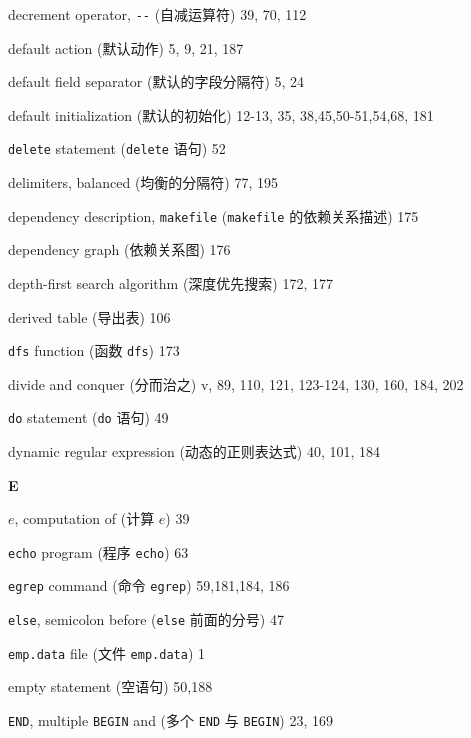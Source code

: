 \begin{multicols}{2}
\hangindent=2pc  decrement operator, \verb'--' (自减运算符) 39, 70, 112

\hangindent=2pc  default action (默认动作) 5, 9, 21, 187

\hangindent=2pc  default field separator (默认的字段分隔符) 5, 24

\hangindent=2pc  default initialization (默认的初始化) 12-13, 35, 38,45,50-51,54,68, 181

\hangindent=2pc  \verb'delete' statement (\verb'delete' 语句) 52

\hangindent=2pc  delimiters, balanced (均衡的分隔符) 77, 195

\hangindent=2pc  dependency description, \verb'makefile'
(\verb'makefile' 的依赖关系描述) 175

\hangindent=2pc  dependency graph (依赖关系图) 176

\hangindent=2pc  depth-first search algorithm (深度优先搜索) 172, 177

\hangindent=2pc  derived table (导出表) 106

\hangindent=2pc  \verb'dfs' function (函数 \verb'dfs') 173

\hangindent=2pc  divide and conquer (分而治之) v, 89, 110, 121, 123-124, 130, 160, 184, 202

\hangindent=2pc  \verb'do' statement (\verb'do' 语句) 49

\hangindent=2pc  dynamic regular expression (动态的正则表达式) 40,  101, 184

\medskip\textbf{\large{E}}

\hangindent=2pc  $e$, computation of (计算 $e$) 39

\hangindent=2pc  \verb'echo' program (程序 \verb'echo') 63

\hangindent=2pc  \verb'egrep' command (命令 \verb'egrep') 59,181,184, 186

\hangindent=2pc  \verb'else', semicolon before (\verb'else'
前面的分号) 47

\hangindent=2pc  \verb'emp.data' file (文件 \verb'emp.data') 1

\hangindent=2pc  empty statement (空语句) 50,188

\hangindent=2pc  \verb'END', multiple \verb'BEGIN' and (多个
\verb'END' 与 \verb'BEGIN') 23, 169


\end{multicols}
